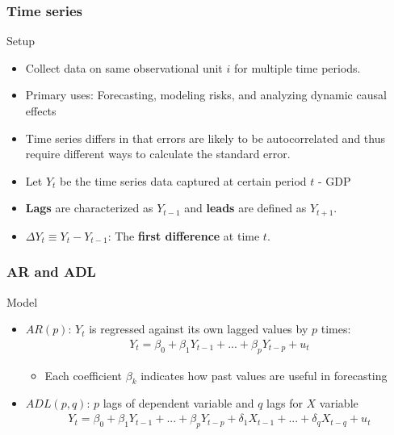 \begin{frame}
\frametitle{Time series}
Setup
\begin{itemize}
\item Collect data on same observational unit $i$ for multiple time periods. 
\item Primary uses: Forecasting, modeling risks, and analyzing dynamic causal effects
\item Time series differs in that errors are likely to be autocorrelated and thus require different ways to calculate the standard error. 
\item Let $Y_t$ be the time series data captured at certain period $t$ - GDP
\item \textbf{Lags} are characterized as $Y_{t-1}$ and \textbf{leads} are defined as $Y_{t+1}$. 
\item $\Delta Y_{t}\equiv Y_t-Y_{t-1}$: The \textbf{first difference} at time $t$. 
\end{itemize}
\end{frame}


\begin{frame}
\frametitle{AR and ADL}
Model
\begin{itemize}
\item $AR(p)$: $Y_t$ is regressed against its own lagged values by $p$ times: 
\begin{align*}
Y_t = \beta_{0}+\beta_{1}Y_{t-1}+...+\beta_pY_{t-p}+u_t 
\end{align*}
\begin{itemize}
\item Each coefficient $\beta_k$ indicates how past values are useful in forecasting
\end{itemize}
\item $ADL(p,q)$: $p$ lags of dependent variable and $q$ lags for $X$ variable
\begin{align*}
Y_t = \beta_{0}+\beta_{1}Y_{t-1}+...+\beta_p Y_{t-p} + \delta_{1} X_{t-1}+...+\delta_qX_{t-q}+u_t 
\end{align*}
\end{itemize}
\end{frame}


